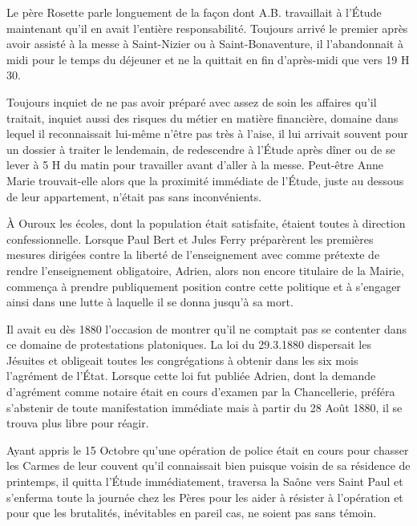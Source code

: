 \documentclass[11pt,a4paper]{report}
\begin{document}
Le père Rosette parle longuement de la façon dont A.B. travaillait à l'Étude maintenant qu'il en avait l'entière responsabilité. Toujours arrivé le premier après avoir assisté à la messe à Saint-Nizier ou à Saint-Bonaventure, il l'abandonnait à midi pour le temps du déjeuner et ne la quittait en fin d'après-midi que vers 19 H 30.

Toujours inquiet de ne pas avoir préparé avec assez de soin les affaires qu'il traitait, inquiet aussi des risques du métier en matière financière, domaine dans lequel il reconnaissait lui-même n'être pas très à l'aise, il lui arrivait souvent pour un dossier à traiter le lendemain, de redescendre à l'Étude après dîner ou de se lever à 5 H du matin pour travailler avant d'aller à la messe. Peut-être Anne Marie trouvait-elle alors que la proximité immédiate de l'Étude, juste au dessous de leur appartement, n'était pas sans inconvénients.

À Ouroux les écoles, dont la population était satisfaite, étaient toutes à direction confessionnelle. Lorsque Paul Bert et Jules Ferry préparèrent les premières mesures dirigées contre la liberté de l'enseignement avec comme prétexte de rendre l'enseignement obligatoire, Adrien, alors non encore titulaire de la Mairie, commença à prendre publiquement position contre cette politique et à s'engager ainsi dans une lutte à laquelle il se donna jusqu'à sa mort.

Il avait eu dès 1880 l'occasion de montrer qu'il ne comptait pas se contenter dans ce domaine de protestations platoniques. La loi du 29.3.1880 dispersait les Jésuites et obligeait toutes les congrégations à obtenir dans les six mois l'agrément de l'État. Lorsque cette loi fut publiée Adrien, dont la demande d'agrément comme notaire était en cours d'examen par la Chancellerie, préféra s'abstenir de toute manifestation immédiate mais à partir du 28 Août 1880, il se trouva plus libre pour réagir.


Ayant appris le 15 Octobre qu'une opération de police était en cours pour chasser les Carmes de leur couvent qu'il connaissait bien puisque voisin de sa résidence de printemps, il quitta l'Étude immédiatement, traversa la Saône vers Saint Paul et s'enferma toute la journée chez les Pères pour les aider à résister à l'opération et pour que les brutalités, inévitables en pareil cas, ne soient pas sans témoin.
\end{document}
